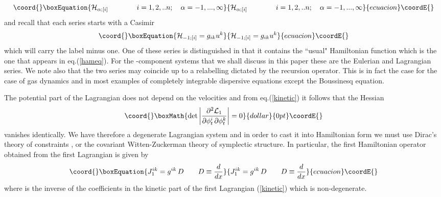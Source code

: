 \documentclass[a4paper,12pt]{article}
\begin{document}
\begin{equation}\coord{}\boxEquation{
{\cal H}_{\alpha ; [i]} \qquad \qquad i=1,2,..n; \quad
\alpha=-1,...,\infty  \label{series}
}{
{\cal H}_{\alpha ; [i]} \qquad \qquad i=1,2,..n; \quad
\alpha=-1,...,\infty  }{ecuacion}\coordE{}\end{equation}
and recall that each series starts with a Casimir
\begin{equation}\coord{}\boxEquation{
 {\cal H}_{-1 ; [i]} = g_{ik} u^k   \label{casimir}
}{
 {\cal H}_{-1 ; [i]} = g_{ik} u^k   }{ecuacion}\coordE{}\end{equation}
which will carry the label minus one. One of these series is
distinguished in that it contains the ``usual" Hamiltonian
function which is the one that appears in eq.(\ref{hameq}). For
the \coordHE{}-component systems that we shall discuss in this paper
these are the Eulerian and Lagrangian series. We note also that
the two series may coincide up to a relabelling dictated by the
recursion operator. This is in fact the case for the \coordHE{}
case of gas dynamics and in most examples of completely integrable
dispersive equations except the Boussinesq equation.

The potential part of the Lagrangian does not depend on the
velocities and from eq.(\ref{kinetic}) it follows that the Hessian
$$\coord{}\boxMath{ \det \left| \frac{\partial^2 {\cal L}_1}{\partial \phi^i_t \,
\partial \phi^k_t} \right| = 0 }{dollar}{0pt}\coordE{}$$
vanishes identically. We have therefore a degenerate Lagrangian
system and in order to cast it into Hamiltonian form we must use
Dirac's theory of constraints \cite{dirac}, or the covariant
Witten-Zuckerman theory \cite{witten,zuck} of symplectic
structure. In particular, the first Hamiltonian operator obtained
from the first Lagrangian is given by
\begin{equation}\coord{}\boxEquation{
J^{ik}_{1}  = g^{ik} \, D   \qquad D \equiv \frac{d}{d x}
\label{j0}
}{
J^{ik}_{1}  = g^{ik} \, D   \qquad D \equiv \frac{d}{d x}
}{ecuacion}\coordE{}\end{equation}
where \coordHE{} is the inverse of the coefficients in the kinetic
part of the first Lagrangian (\ref{kinetic}) which is
non-degenerate.
\end{document}
